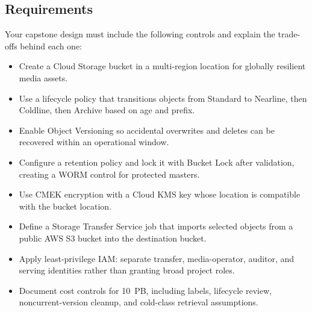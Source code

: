 \subsection*{Requirements}
Your capstone design must include the following controls and explain the trade-offs behind each one:
\begin{itemize}
    \item Create a Cloud Storage bucket in a multi-region location for globally resilient media assets.
    \item Use a lifecycle policy that transitions objects from Standard to Nearline, then Coldline, then Archive based on age and prefix.
    \item Enable Object Versioning so accidental overwrites and deletes can be recovered within an operational window.
    \item Configure a retention policy and lock it with Bucket Lock after validation, creating a WORM control for protected masters.
    \item Use CMEK encryption with a Cloud KMS key whose location is compatible with the bucket location.
    \item Define a Storage Transfer Service job that imports selected objects from a public AWS S3 bucket into the destination bucket.
    \item Apply least-privilege IAM: separate transfer, media-operator, auditor, and serving identities rather than granting broad project roles.
    \item Document cost controls for 10~PB, including labels, lifecycle review, noncurrent-version cleanup, and cold-class retrieval assumptions.
\end{itemize}

